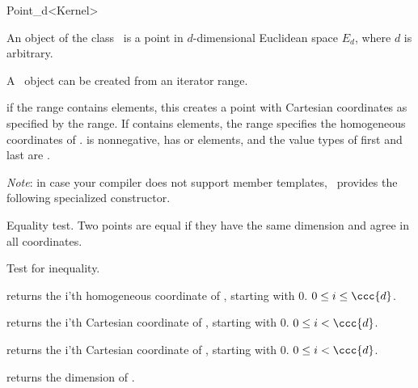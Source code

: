 \begin{ccRefClass}{Point_d<Kernel>}

\ccDefinition

An object of the class \ccClassTemplateName\ is a point in $d$-dimensional
Euclidean space $E_d$, where $d$ is arbitrary. 


\ccCreation
{}

A \ccClassTemplateName\ object can be created from an iterator range. 

        {if the range \ccc{[first,last)} contains  elements,
         this creates a point with Cartesian coordinates as specified by 
         the range. If \ccc{[first,last)} contains  elements,
         the range specifies the homogeneous coordinates of \ccVar. 
         \ccPrecond {} is nonnegative, \ccc{[first,last)} has 
          or  elements, and the value types of first
         and last are .}

\emph{Note}: in case your compiler does not support member templates, \cgal\
provides the following specialized constructor.


\ccOperations

        {Equality test. Two points are equal if they have the same
         dimension and agree in all coordinates.}

        {Test for inequality.}

        {returns the i'th homogeneous coordinate of \ccVar, starting
         with 0. \ccPrecond $0\leq i\leq \ccc{d}$.}

        {returns the i'th Cartesian coordinate of \ccVar, starting
         with 0. \ccPrecond $0\leq i < \ccc{d}$.}

        {returns the i'th Cartesian coordinate of \ccVar, starting
        with 0. \ccPrecond $0\leq i < $.}

        {returns the dimension \ccc{d} of \ccVar.}

\ccSeeAlso
{}

\end{ccRefClass}%
